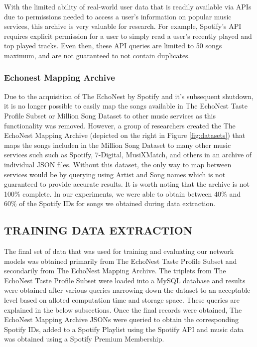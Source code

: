         With the limited ability of real-world user data that is readily available via APIs due to permissions needed to access a user's information on popular music services, this archive is very valuable for research. For example, Spotify's API requires explicit permission for a user to simply read a user's recently played and top played tracks. \cite{spotify_permissions} Even then, these API queries are limited to 50 songs maximum, and are not guaranteed to not contain duplicates. \cite{spotify_recent,spotify_top} 
        \subsubsection{Echonest Mapping Archive}
        Due to the acquisition of The EchoNest by Spotify and it's subsequent shutdown, it is no longer possible to easily map the songs available in The EchoNest Taste Profile Subset or Million Song Dataset to other music services as this functionality was removed. However, a group of researchers created the The EchoNest Mapping Archive (depicted on the right in Figure \ref{fig:datasets}) that maps the songs includen in the Million Song Dataset to many other music services such such as Spotify, 7-Digital, MusiXMatch, and others in an archive of individual JSON files. \cite{map_site} Without this dataset, the only way to map between services would be by querying using Artist and Song names which is not guaranteed to provide accurate results. It is worth noting that the archive is not 100\% complete. In our experiments, we were able to obtain between 40\% and 60\% of the Spotify IDs for songs we obtained during data extraction.
        
    \subsection{TRAINING DATA EXTRACTION}
    The final set of data that was used for training and evaluating our network models was obtained primarily from The EchoNest Taste Profile Subset and secondarily from The EchoNest Mapping Archive. The triplets from The EchoNest Taste Profile Subset were loaded into a MySQL database and results were obtained after various queries narrowing down the dataset to an acceptable level based on alloted computation time and storage space. These queries are explained in the below subsections. Once the final records were obtained, The EchoNest Mapping Archive JSONs were queried to obtain the corresponding Spotify IDs, added to a Spotify Playlist using the Spotify API and music data was obtained using a Spotify Premium Membership.
